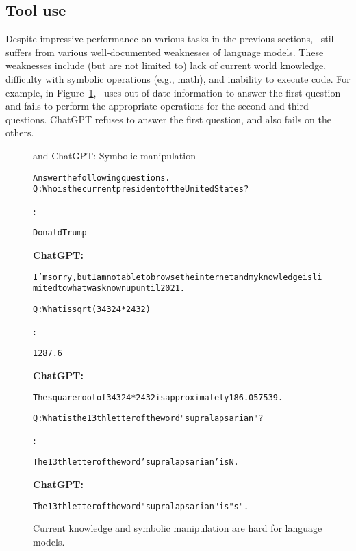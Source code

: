 \subsection{Tool use}
\label{sec:affordances}

Despite impressive performance on various tasks in the previous sections, \DV\ still suffers from various well-documented weaknesses of language models. These weaknesses include (but are not limited to) lack of current world knowledge, difficulty with symbolic operations (e.g., math), and inability to execute code.
For example, in Figure~\ref{fig:lmfails}, \DV\ uses out-of-date information to answer the first question and fails to perform the appropriate operations for the second and third questions. ChatGPT refuses to answer the first question, and also fails on the others.

\begin{figure}[!h]
\begin{AIbox}{\DV and ChatGPT: Symbolic manipulation}
\begin{alltt}
Answer the following questions.
Q: Who is the current president of the United States?
\end{alltt}
\parbox[t]{0.48\textwidth}{{\bf \DV:}\small \begin{alltt}
Donald Trump
\end{alltt}}\hspace{0.03\textwidth}
\parbox[t]{0.48\textwidth}{{\bf ChatGPT:} \small \begin{alltt}
I'm sorry, but I am not able to browse the internet and my knowledge is limited to what was known up until 2021.
\end{alltt}}
\tcbline
\parbox[t]{\textwidth}{
\begin{alltt}
Q: What is sqrt(34324 * 2432)
\end{alltt}
}
\parbox[t]{0.48\textwidth}{{\bf \DV:}\small \begin{alltt}
1287.6
\end{alltt}}\hspace{0.03\textwidth}
\parbox[t]{0.48\textwidth}{{\bf ChatGPT:} \small \begin{alltt}
The square root of 34324*2432 is approximately 186.057539.
\end{alltt}}
\tcbline
\parbox[t]{\textwidth}{
\begin{alltt}
Q: What is the 13th letter of the word "supralapsarian"?
\end{alltt}
}
\parbox[t]{0.48\textwidth}{{\bf \DV:}\small \begin{alltt}
The 13th letter of the word 'supralapsarian' is N.
\end{alltt}}\hspace{0.03\textwidth}
\parbox[t]{0.48\textwidth}{{\bf ChatGPT:} \small \begin{alltt}
The 13th letter of the word "supralapsarian" is "s".
\end{alltt}}
\end{AIbox}
\caption{Current knowledge and symbolic manipulation are hard for language models.}
\label{fig:lmfails}
\end{figure}


